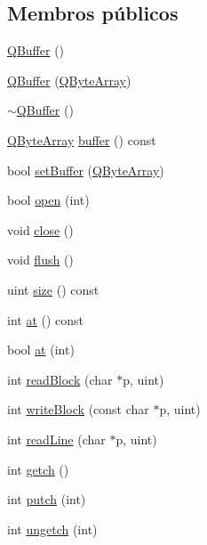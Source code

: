 \subsection*{Membros públicos}
\begin{DoxyCompactItemize}
\item 
\hyperlink{class_q_buffer_aac02a1c611353dc1d99b1dfb09c8a27c}{Q\-Buffer} ()
\item 
\hyperlink{class_q_buffer_a98bfc70efe53b2a957b62ab36ea5a2d2}{Q\-Buffer} (\hyperlink{class_q_array}{Q\-Byte\-Array})
\item 
\hyperlink{class_q_buffer_a71365eb7d495b7458eae14c8d526e99a}{$\sim$\-Q\-Buffer} ()
\item 
\hyperlink{class_q_array}{Q\-Byte\-Array} \hyperlink{class_q_buffer_a43d523429a825949b8dc91d8be644c5e}{buffer} () const 
\item 
bool \hyperlink{class_q_buffer_aa534d25726eede2993b4895e9b8ceb21}{set\-Buffer} (\hyperlink{class_q_array}{Q\-Byte\-Array})
\item 
bool \hyperlink{class_q_buffer_ae7331757d844e703f2f6e4727e454193}{open} (int)
\item 
void \hyperlink{class_q_buffer_a5ae591df94fc66ccb85cbb6565368bca}{close} ()
\item 
void \hyperlink{class_q_buffer_adac116554b543b7c4228c018a85882f5}{flush} ()
\item 
uint \hyperlink{class_q_buffer_a7e63723212bed1ca52f0fe57e58b812e}{size} () const 
\item 
int \hyperlink{class_q_buffer_a3bce8d0bb4d6fbaa012b9a61c3910907}{at} () const 
\item 
bool \hyperlink{class_q_buffer_afbf6dc03efea5d2f5098b8316a8a66b9}{at} (int)
\item 
int \hyperlink{class_q_buffer_a391d82301a9f520c9b569522402aed84}{read\-Block} (char $\ast$p, uint)
\item 
int \hyperlink{class_q_buffer_abd0e68627d02e1a66a3c8684c04314db}{write\-Block} (const char $\ast$p, uint)
\item 
int \hyperlink{class_q_buffer_af19c7fb4af1fd67d5d2c17cd10ef6320}{read\-Line} (char $\ast$p, uint)
\item 
int \hyperlink{class_q_buffer_a160f6d2893bb6b89ab3ad5d863c20e3d}{getch} ()
\item 
int \hyperlink{class_q_buffer_a9e6c0b0babdacae50c15aa246803e771}{putch} (int)
\item 
int \hyperlink{class_q_buffer_a574c1d3f303340347106bf2cdaad5568}{ungetch} (int)
\end{DoxyCompactItemize}
